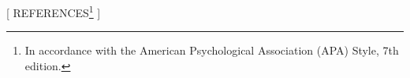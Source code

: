 \usepackage[
    style=apa,
    backend=biber,
    language=english,
    url=true,
    useprefix=false,
    giveninits=true
]{biblatex}

\usepackage{csquotes}


\renewcommand{\bibname}{REFERENCES}
\newcommand{\newbibname}{REFERENCES}

\newcommand{\bibnamewithfootnote}{
    \newbibname\protect\footnote{
        In accordance with the American Psychological Association (APA) Style, 7th edition.
    }
}

\setlength{\bibhang}{0.5cm}
\setlength{\bibparsep}{1ex}


[\bibnamewithfootnote]{
}

\AtBeginBibliography{\vspace{0.5\baselineskip}}
